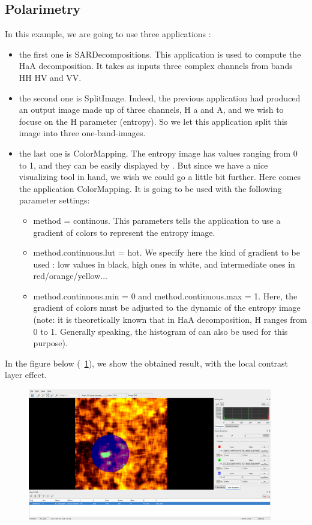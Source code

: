 \subsection{Polarimetry}\label{ssec:monpolar}
In this example, we are going to use three applications : 
\begin{itemize}
\item the first one is SARDecompositions. This application is used to compute the HaA decomposition. It takes as inputs three complex channels from bands HH HV and VV.
\item the second one is SplitImage. Indeed, the previous application had produced an output image made up of three channels, H a and A, and we wish to focuse on the H parameter (entropy). 
So we let this application split this image into three one-band-images.
\item the last one is ColorMapping. The entropy image has values ranging from 0 to 1, and they can be easily displayed by \mont. But since we have a nice visualizing tool in hand, we wish we could go a little bit further.
Here comes the application ColorMapping. It is going to be used with the following parameter settings:
\begin{itemize}
\item method = continous. This parameters tells the application to use a gradient of colors to represent the entropy image.
\item method.continuous.lut = hot. We specify here the kind of gradient to be used : low values in black, high ones in white, and intermediate ones in red/orange/yellow...
\item method.continuous.min = 0 and method.continuous.max = 1. Here, the gradient of colors must be adjusted to the dynamic of the entropy image (note: it is theoretically known that in HaA decomposition, H ranges from 0 to 1. Generally speaking, the histogram of \mont can also be used for this purpose).
\end{itemize}
\end{itemize}

In the figure below (~\ref{fig:pol1}), we show the obtained result, with the local contrast layer effect.

\begin{figure}[!h] 
  \center
  \includegraphics[width=0.95\textwidth]{../Art/MonteverdiImages/pol1.png}
  \label{fig:pol1}
\end{figure}


